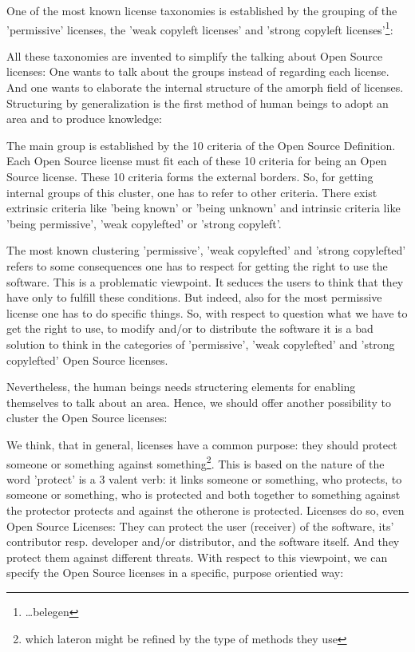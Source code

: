 One of the most known license taxonomies is established by the grouping of the
'permissive' licenses, the 'weak copyleft licenses' and 'strong copyleft
licenses'\footnote{ \ldots belegen
}:


All these taxonomies are invented to simplify the talking about Open Source
licenses: One wants to talk about the groups instead of regarding each license.
And one wants to elaborate the internal structure of the amorph field of
licenses. Structuring by generalization is the first method of human beings to
adopt an area and to produce knowledge:

The main group is established by the 10 criteria of the Open Source Definition.
Each Open Source license must fit each of these 10 criteria for being an Open
Source license. These 10 criteria forms the external borders. So, for getting
internal groups of this cluster, one has to refer to other criteria. There exist
extrinsic criteria like 'being known' or 'being unknown' and intrinsic criteria
like 'being permissive', 'weak copylefted' or 'strong copyleft'.

The most known clustering 'permissive', 'weak copylefted' and 'strong
copylefted' refers to some consequences one has to respect for getting the right
to use the software. This is a problematic viewpoint. It seduces the users to
think that they have only to fulfill these conditions. But indeed, also for the
most permissive license one has to do specific things. So, with respect to
question what we have to get the right to use, to modify and/or to distribute
the software it is a bad solution to think in the categories of 'permissive',
'weak copylefted' and 'strong copylefted' Open Source licenses.

Nevertheless, the human beings needs structering elements for enabling
themselves to talk about an area. Hence, we should offer another possibility to
cluster the Open Source licenses:

We think, that in general, licenses have a common purpose: they should protect
someone or something against something\footnote{which lateron might be refined
by the type of methods they use}. This is based on the nature of the word
'protect' is a 3 valent verb: it links someone or something, who protects, to
someone or something, who is protected and both together to something against
the protector protects and against the otherone is protected. Licenses do so,
even Open Source Licenses: They can protect the user (receiver) of the software,
its' contributor resp. developer and/or distributor, and the software itself.
And they protect them against different threats. With respect to this viewpoint,
we can specify the Open Source licenses in a specific, purpose orientied way:

